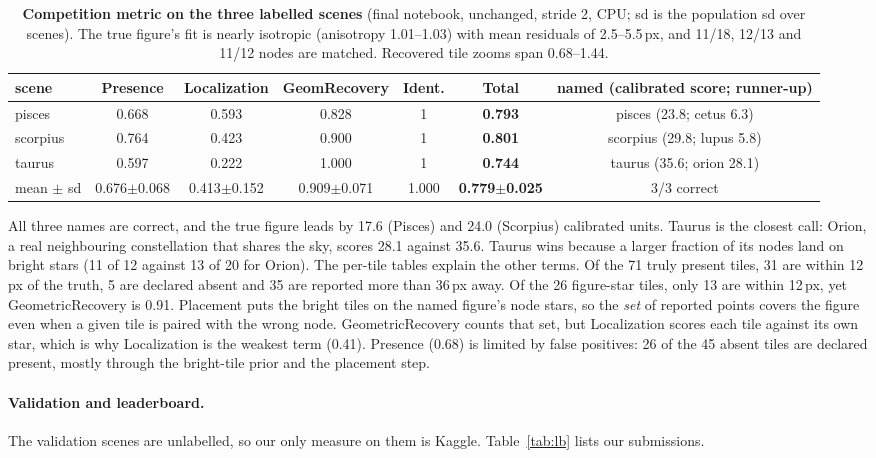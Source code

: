 \documentclass[a4paper,11pt]{article}
\begin{document}
\begin{table}[h]
\centering\small
\begin{tabular}{lcccccc}
\toprule
scene & Presence & Localization & GeomRecovery & Ident. & \textbf{Total} & named (calibrated score; runner-up) \\
\midrule
pisces   & 0.668 & 0.593 & 0.828 & 1 & \textbf{0.793} & pisces (23.8; cetus 6.3) \\
scorpius & 0.764 & 0.423 & 0.900 & 1 & \textbf{0.801} & scorpius (29.8; lupus 5.8) \\
taurus   & 0.597 & 0.222 & 1.000 & 1 & \textbf{0.744} & taurus (35.6; orion 28.1) \\
\midrule
mean $\pm$ sd & 0.676$\pm$0.068 & 0.413$\pm$0.152 & 0.909$\pm$0.071 & 1.000 & \textbf{0.779$\pm$0.025} & 3/3 correct \\
\bottomrule
\end{tabular}
\caption{\textbf{Competition metric on the three labelled scenes} (final notebook, unchanged, stride 2, CPU; sd is the
population sd over scenes). The true figure's fit is nearly isotropic (anisotropy 1.01--1.03) with mean residuals of
2.5--5.5\,px, and 11/18, 12/13 and 11/12 nodes are matched. Recovered tile zooms span 0.68--1.44.}
\label{tab:train}
\end{table}

All three names are correct, and the true figure leads by 17.6 (Pisces) and 24.0 (Scorpius) calibrated units. Taurus
is the closest call: Orion, a real neighbouring constellation that shares the sky, scores 28.1 against 35.6. Taurus wins
because a larger fraction of its nodes land on bright stars (11 of 12 against 13 of 20 for Orion). The per-tile tables explain the other terms. Of the 71 truly present tiles, 31 are within 12\,px of the truth, 5 are declared
absent and 35 are reported more than 36\,px away. Of the 26 figure-star tiles, only 13 are within 12\,px, yet
GeometricRecovery is 0.91. Placement puts the bright tiles on the named figure's node stars, so the \emph{set} of reported
points covers the figure even when a given tile is paired with the wrong node. GeometricRecovery counts that set, but
Localization scores each tile against its own star, which is why Localization is the weakest term (0.41). Presence (0.68)
is limited by false positives: 26 of the 45 absent tiles are declared present, mostly through the bright-tile prior and
the placement step.

\paragraph{Validation and leaderboard.} The validation scenes are unlabelled, so our only measure on them is
Kaggle. Table~\ref{tab:lb} lists our submissions.
\end{document}
